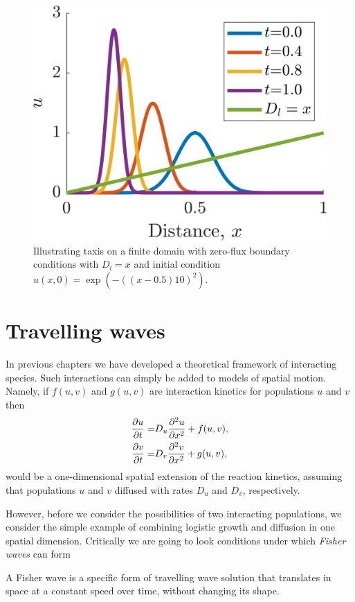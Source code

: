 \begin{figure}[!!!h!!!tb]
\centering
\includegraphics[width=\ttp]{../Pictures/Taxis.png}
\caption{Illustrating taxis on a finite domain with zero-flux boundary conditions with $D_l=x$ and initial condition $u(x,0)=\exp(-((x-0.5)10)^2)$. }
\end{figure}
\section{Travelling waves}
In previous chapters we have developed a theoretical framework of interacting species. Such interactions can simply be added to models of spatial motion. Namely, if $f(u,v)$ and $g(u,v)$ are interaction kinetics for populations $u$ and $v$ then
\begin{align}
\frac{\partial u}{\partial t}=&D_u\frac{\partial^2 u}{\partial x^2}+f(u,v),\\
\frac{\partial v}{\partial t}=&D_v\frac{\partial^2 v}{\partial x^2}+g(u,v),
\end{align}
would be a one-dimensional spatial extension of the reaction kinetics, assuming that populations $u$ and $v$ diffused with rates $D_u$ and $D_v$, respectively.

However, before we consider the possibilities of two interacting populations, we consider the simple example of combining logistic growth and diffusion in one spatial dimension. Critically we are going to look conditions under which \textit{Fisher waves} can form
\begin{defin}\label{Fisher_wave}
A Fisher wave is a specific form of travelling wave solution that translates in space at a constant speed over time, without changing its shape.
\end{defin}

